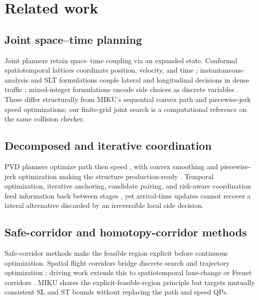 \section{Related work}
\label{sec:related_work}

\subsection{Joint space--time planning}

Joint planners retain space--time coupling via an expanded state. Conformal spatiotemporal lattices coordinate position, velocity, and time \citep{mcnaughton2011lattice}; instantaneous-analysis and SLT formulations couple lateral and longitudinal decisions in dense traffic \citep{yang2021_ia_planner,hu2023_hybrid_astar_slt,hu2025_dp_nmpc,qiao2025stjoint}; mixed-integer formulations encode side choices as discrete variables \citep{kessler2023}. These differ structurally from MIKU's sequential convex path and piecewise-jerk speed optimizations; our finite-grid joint search is a computational reference on the same collision checker.

\subsection{Decomposed and iterative coordination}

PVD planners optimize path then speed \citep{kant1986pvd,werling2010}, with convex smoothing and piecewise-jerk optimization making the structure production-ready \citep{fan2018baidu,zhou2021dliaps,zhang2020pathqp}. Temporal optimization, iterative anchoring, candidate pairing, and risk-aware coordination feed information back between stages \citep{liu2017speed,chen2019em,zhang2024_dp_rcg,han2026_contingency,pathspeedstructured2024}, yet arrival-time updates cannot recover a lateral alternative discarded by an irreversible local side decision.

\subsection{Safe-corridor and homotopy-corridor methods}

Safe-corridor methods make the feasible region explicit before continuous optimization. Spatial flight corridors bridge discrete search and trajectory optimization \citep{liu2017sfc}; driving work extends this to spatiotemporal lane-change or Frenet corridors \citep{yoon2024stcorridor,frenetcorridor2025}. MIKU shares the explicit-feasible-region principle but targets mutually consistent SL and ST bounds without replacing the path and speed QPs.

